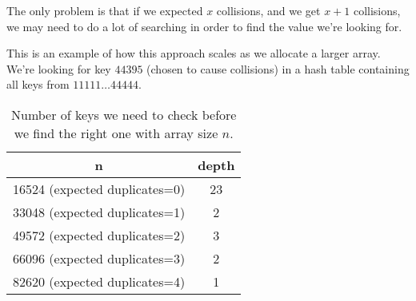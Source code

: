 \documentclass[a4paper,11pt]{article}
\begin{document}
The only problem is that if we expected $x$ collisions, and we get $x+1$ collisions, we may need to do a lot of searching in order to find the value we're looking for.

This is an example of how this approach scales as we allocate a larger array. We're looking for key $44395$ (chosen to cause collisions) in a hash table containing all keys from $11111 \dots 44444$.

\begin{table}[H]
\centering
\begin{tabular}{|c|c|}
\hline
\textbf{n} & \textbf{depth} \\
\hline
	16524 (expected duplicates=0) & 23 \\
	33048 (expected duplicates=1) & 2 \\
	49572 (expected duplicates=2) & 3 \\
	66096 (expected duplicates=3) & 2 \\
	82620 (expected duplicates=4) & 1 \\
\hline
\end{tabular}
\caption{Number of keys we need to check before we find the right one with array size $n$.}
\label{tab:table2}
\end{table}
\end{document}
